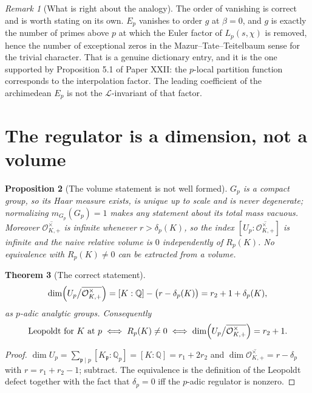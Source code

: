 \documentclass[11pt]{amsart}
\numberwithin{equation}{section}
\newtheorem{theorem}{Theorem}[section]
\newtheorem{proposition}[theorem]{Proposition}
\theoremstyle{definition}
\theoremstyle{remark}
\newtheorem{remark}[theorem]{Remark}
\newcommand{\Q}{\mathbb{Q}}
\newcommand{\cO}{\mathcal{O}}
\newcommand{\cL}{\mathcal{L}}
\newcommand{\pp}{\mathfrak{p}}
\begin{document}
\begin{remark}[What is right about the analogy]\label{rem:rightpart}
The order of vanishing is correct and is worth stating on its own. $E_p$ vanishes to order
$g$ at $\beta=0$, and $g$ is exactly the number of primes above $p$ at which the Euler factor
of $L_p(s,\chi)$ is removed, hence the number of exceptional zeros in the
Mazur--Tate--Teitelbaum sense \cite{MTT} for the trivial character. That is a genuine dictionary entry,
and it is the one supported by Proposition 5.1 of Paper XXII: the $p$-local partition function
corresponds to the interpolation factor. The leading coefficient of the archimedean $E_p$ is
not the $\cL$-invariant of that factor.
\end{remark}

\section{The regulator is a dimension, not a volume}

\begin{proposition}[The volume statement is not well formed]\label{prop:novolume}
$G_p$ is a compact group, so its Haar measure exists, is unique up to scale and is never
degenerate; normalizing $m_{G_p}(G_p)=1$ makes any statement about its total mass vacuous.
Moreover $\overline{\cO^\times_{K,+}}$ is infinite whenever $r>\delta_p(K)$, so the index
$[U_p:\overline{\cO^\times_{K,+}}]$ is infinite and the naive relative volume is $0$
independently of $R_p(K)$. No equivalence with $R_p(K)\ne0$ can be extracted from a volume.
\end{proposition}

\begin{theorem}[The correct statement]\label{thm:dimension}
\[
\dim\Bigl(U_p\big/\overline{\cO^\times_{K,+}}\Bigr)
=[K:\Q]-\bigl(r-\delta_p(K)\bigr)
=r_2+1+\delta_p(K),
\]
as $p$-adic analytic groups. Consequently
\[
\text{Leopoldt for }K\text{ at }p\iff R_p(K)\ne0\iff \dim\Bigl(U_p\big/\overline{\cO^\times_{K,+}}\Bigr)=r_2+1 .
\]
\end{theorem}

\begin{proof}
$\dim U_p=\sum_{\pp\mid p}[K_\pp:\Q_p]=[K:\Q]=r_1+2r_2$ and
$\dim\overline{\cO^\times_{K,+}}=r-\delta_p$ with $r=r_1+r_2-1$; subtract. The equivalence is
the definition of the Leopoldt defect together with the fact that $\delta_p=0$ iff the
$p$-adic regulator is nonzero.
\end{proof}
\end{document}
